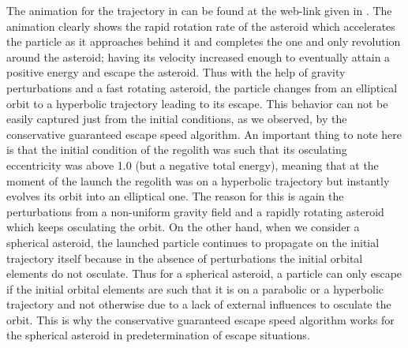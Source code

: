 \FloatBarrier
The animation for the trajectory in  can be found at the web-link given in . The animation clearly shows the rapid rotation rate of the asteroid which accelerates the particle as it approaches behind it and completes the one and only revolution around the asteroid; having its velocity increased enough to eventually attain a positive energy and escape the asteroid. Thus with the help of gravity perturbations and a fast rotating asteroid, the particle changes from an elliptical orbit to a hyperbolic trajectory leading to its escape. This behavior can not be easily captured just from the initial conditions, as we observed, by the conservative guaranteed escape speed algorithm.
%
\newline\newline
%
An important thing to note here is that the initial condition of the regolith was such that its osculating eccentricity was above 1.0 (but a negative total energy), meaning that at the moment of the launch the regolith was on a hyperbolic trajectory but instantly evolves its orbit into an elliptical one. The reason for this is again the perturbations from a non-uniform gravity field and a rapidly rotating asteroid which keeps osculating the orbit. On the other hand, when we consider a spherical asteroid, the launched particle continues to propagate on the initial trajectory itself because in the absence of perturbations the initial orbital elements do not osculate. Thus for a spherical asteroid, a particle can only escape if the initial orbital elements are such that it is on a parabolic or a hyperbolic trajectory and not otherwise due to a lack of external influences to osculate the orbit. This is why the conservative guaranteed escape speed algorithm works for the spherical asteroid in predetermination of escape situations.
